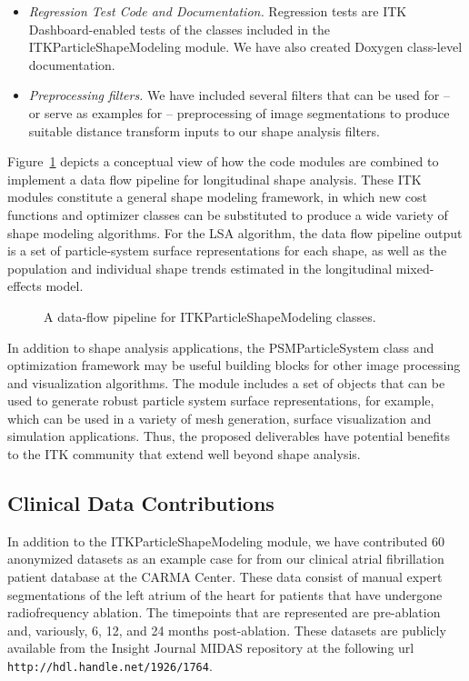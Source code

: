 \documentclass[11pt]{article}
\begin{document}
\begin{itemize}
{    management.}  The use of the shape modeling algorithms requires
  wrangling many image inputs and point-set outputs, as well as
  specifying parameters across multiple scales of optimization.  To
  facilitate development of applications with these filters, we have
  included some support for reading XML-based descriptions of shape
  modeling projects and examples of simple applications in the testing
  and Examples section. 
\item{\em Regression Test Code and Documentation.}  Regression tests are ITK
  Dashboard-enabled tests of the classes included in the
  ITKParticleShapeModeling module.  We have also created Doxygen
  class-level documentation.
\item{\em Preprocessing filters.}  We have included several filters
  that can be used for -- or serve as examples for -- preprocessing of image
  segmentations to produce suitable distance transform inputs to our
  shape analysis filters.
\end{itemize} 

Figure~\ref{fig:modules} depicts a conceptual view of how the code
modules are combined to implement a data flow pipeline for
longitudinal shape analysis.  These ITK modules constitute a
general shape modeling framework, in which new cost functions and
optimizer classes can be substituted to produce a wide variety of
shape modeling algorithms.  For the LSA algorithm, the data flow
pipeline output is a set of particle-system surface representations
for each shape, as well as the population and individual shape trends
estimated in the longitudinal mixed-effects model.
\begin{figure}[tb]
\centering
\caption{\label{fig:modules}A data-flow pipeline for ITKParticleShapeModeling classes.}
\end{figure}

In addition to shape analysis applications, the PSMParticleSystem
class and optimization framework may be useful building blocks for
other image processing and visualization algorithms.  The module
includes a set of objects that can be used to generate robust particle
system surface representations, for example, which can be used in a
variety of mesh generation, surface visualization and simulation
applications. Thus, the proposed deliverables have potential benefits
to the ITK community that extend well beyond shape analysis.

\subsection{Clinical Data Contributions}
In addition to the ITKParticleShapeModeling module, we have contributed
60 anonymized datasets as an example case for from our clinical atrial
fibrillation patient database at the CARMA Center.  These data consist
of manual expert segmentations of the left atrium of the heart for
patients that have undergone radiofrequency ablation.  The timepoints
that are represented are pre-ablation and, variously, 6, 12, and 24
months post-ablation.  These datasets are publicly available from the
Insight Journal MIDAS repository at the following url
\texttt{http://hdl.handle.net/1926/1764}.
\end{document}
